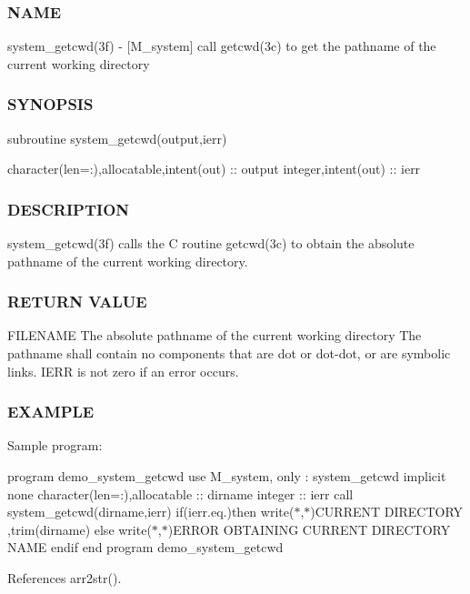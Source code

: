 \subsubsection*{N\+A\+ME}

system\+\_\+getcwd(3f) -\/ \mbox{[}M\+\_\+system\mbox{]} call getcwd(3c) to get the pathname of the current working directory \subsubsection*{S\+Y\+N\+O\+P\+S\+IS}

subroutine system\+\_\+getcwd(output,ierr)

character(len=\+:),allocatable,intent(out) \+:\+: output integer,intent(out) \+:\+: ierr \subsubsection*{D\+E\+S\+C\+R\+I\+P\+T\+I\+ON}

system\+\_\+getcwd(3f) calls the C routine getcwd(3c) to obtain the absolute pathname of the current working directory.

\subsubsection*{R\+E\+T\+U\+RN V\+A\+L\+UE}

F\+I\+L\+E\+N\+A\+ME The absolute pathname of the current working directory The pathname shall contain no components that are dot or dot-\/dot, or are symbolic links. I\+E\+RR is not zero if an error occurs.

\subsubsection*{E\+X\+A\+M\+P\+LE}

Sample program\+:

program demo\+\_\+system\+\_\+getcwd use M\+\_\+system, only \+: system\+\_\+getcwd implicit none character(len=\+:),allocatable \+:\+: dirname integer \+:\+: ierr call system\+\_\+getcwd(dirname,ierr) if(ierr.\+eq.)then write($\ast$,$\ast$)\textquotesingle{}C\+U\+R\+R\+E\+NT D\+I\+R\+E\+C\+T\+O\+RY \textquotesingle{},trim(dirname) else write($\ast$,$\ast$)\textquotesingle{}E\+R\+R\+OR O\+B\+T\+A\+I\+N\+I\+NG C\+U\+R\+R\+E\+NT D\+I\+R\+E\+C\+T\+O\+RY N\+A\+ME\textquotesingle{} endif end program demo\+\_\+system\+\_\+getcwd 

References arr2str().

